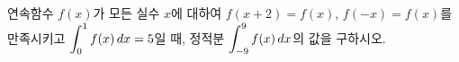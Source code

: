 연속함수 $f(x)$가 모든 실수 $x$에 대하여 $f(x+2)=f(x)$, $f(-x)=f(x)$를 만족시키고 $\displaystyle\int_{0}^{1}f(x)\mkern3mu dx=5$일 때, 정적분 $\displaystyle\int_{-9}^{9}f(x)\mkern3mu dx$의 값을 구하시오.
